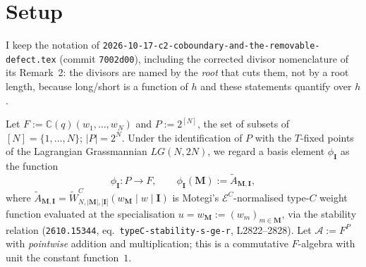 \documentclass[11pt]{article}
\theoremstyle{plain}
\theoremstyle{definition}
\theoremstyle{remark}
\theoremstyle{plain}
\newcommand{\bI}{\mathbf{I}}
\newcommand{\bM}{\mathbf{M}}
\newcommand{\At}{\widetilde{A}}
\begin{document}
\begin{abstract}
\textbf{The pre-registered branch fired, against my stated expectation.}  The
brief pre-registered: \emph{if $\At$ has no $A$-type poles then gap 2 was never a
gap; report that plainly and do not dress a vacuity as a result.}  $\At$ has
none --- the baseline census's $13/115$ non-Laurent constants are
\textbf{pair-divisor poles only}, zero $A$-type, and all $35$ nonzero basis
entries at $N\le3$ are Laurent.  So there was never an $A$-type defect for
$\Psi$ to create or destroy, and gap 2 \emph{as a difference question} is
vacuous.  What is not vacuous is the regularity itself, which was not previously
proved, and its mechanism.  I expected the opposite and say so in
\S\ref{sec:branch}; this is the third time this week I have mispredicted a
normaliser's reach.
\end{abstract}

\tableofcontents

\section{Setup}
\label{sec:setup}

I keep the notation of \texttt{2026-10-17-c2-coboundary-and-the-removable-defect.tex}
(commit \texttt{7002d00}), including the corrected divisor nomenclature of its
Remark~2: the divisors are named by the \emph{root} that cuts them, not by a root
length, because long/short is a function of $h$ and these statements quantify
over $h$.

Let $F:=\mathbb{C}(q)(w_1,\dots,w_N)$ and $P:=2^{[N]}$, the set of subsets of
$[N]=\{1,\dots,N\}$; $|P|=2^N$.  Under the identification of $P$ with the
$T$-fixed points of the Lagrangian Grassmannian $LG(N,2N)$, we regard a basis
element $\phi_\bI$ as the function
\[
   \phi_\bI:P\to F,\qquad \phi_\bI(\bM):=\At_{\bM,\bI},
\]
where $\At_{\bM,\bI}=\widetilde{W}^C_{N,|\bM|,|\bI|}(w_\bM\mid w\mid\bI)$ is
Motegi's $\mathcal{E}^C$-normalised type-$C$ weight function evaluated at the
specialisation $u=w_\bM:=(w_m)_{m\in\bM}$, via the stability relation
(\texttt{2610.15344}, eq.\ \texttt{typeC-stability-s-ge-r}, L2822--2828).  Let
$\mathcal{A}:=F^P$ with \emph{pointwise} addition and multiplication; this is a
commutative $F$-algebra with unit the constant function~$1$.
\end{document}
